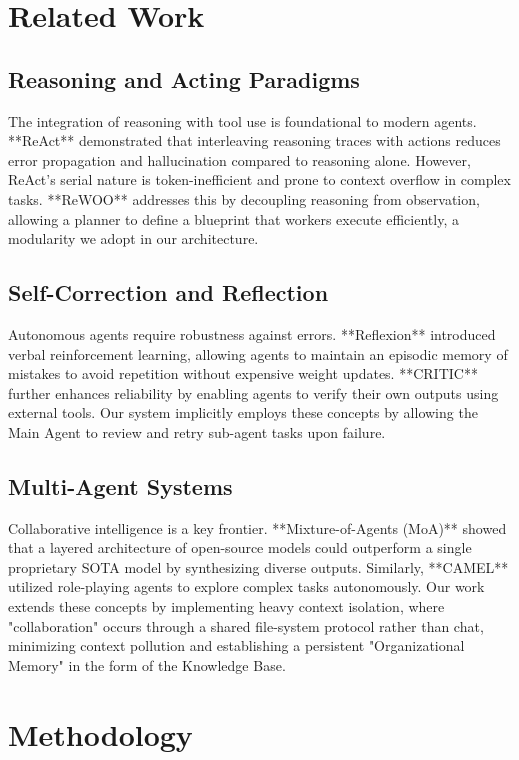 \documentclass[conference]{IEEEtran}
\begin{document}
\section{Related Work}

\subsection{Reasoning and Acting Paradigms}
The integration of reasoning with tool use is foundational to modern agents. **ReAct** \cite{b1} demonstrated that interleaving reasoning traces with actions reduces error propagation and hallucination compared to reasoning alone. However, ReAct's serial nature is token-inefficient and prone to context overflow in complex tasks. **ReWOO** \cite{b2} addresses this by decoupling reasoning from observation, allowing a planner to define a blueprint that workers execute efficiently, a modularity we adopt in our architecture.

\subsection{Self-Correction and Reflection}
Autonomous agents require robustness against errors. **Reflexion** \cite{b3} introduced verbal reinforcement learning, allowing agents to maintain an episodic memory of mistakes to avoid repetition without expensive weight updates. **CRITIC** \cite{b5} further enhances reliability by enabling agents to verify their own outputs using external tools. Our system implicitly employs these concepts by allowing the Main Agent to review and retry sub-agent tasks upon failure.

\subsection{Multi-Agent Systems}
Collaborative intelligence is a key frontier. **Mixture-of-Agents (MoA)** \cite{b4} showed that a layered architecture of open-source models could outperform a single proprietary SOTA model by synthesizing diverse outputs. Similarly, **CAMEL** \cite{b6} utilized role-playing agents to explore complex tasks autonomously. Our work extends these concepts by implementing heavy context isolation, where "collaboration" occurs through a shared file-system protocol rather than chat, minimizing context pollution and establishing a persistent "Organizational Memory" in the form of the Knowledge Base.

\section{Methodology}
\end{document}
